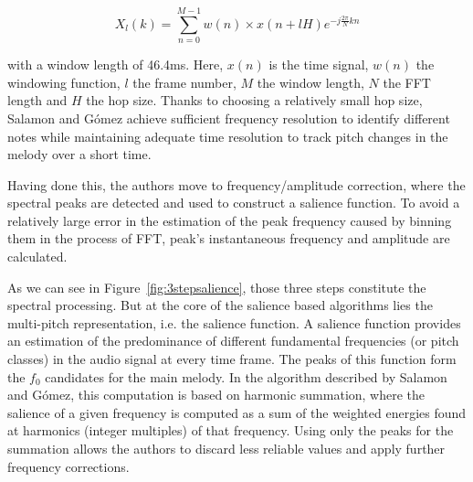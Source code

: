 \begin{equation}
X_{l}(k) = \sum_{n=0}^{M-1} w(n) \times x(n + lH) e^{-j\frac{2 \pi}{N}kn}
\end{equation}

with a window length of 46.4ms. Here, $x(n)$ is the time signal, $w(n)$ the windowing function, $l$ the frame number, $M$ the window length, $N$ the FFT length and $H$ the hop size. Thanks to choosing a relatively small hop size, Salamon and G\'{o}mez achieve sufficient frequency resolution to identify different notes while maintaining adequate time resolution to track pitch changes in the melody over a short time. 

Having done this, the authors move to frequency/amplitude correction, where the spectral peaks are detected and used to construct a salience function. To avoid a relatively large error in the estimation of the peak frequency caused by binning them in the process of FFT, peak’s instantaneous frequency and amplitude are calculated. 

As we can see in Figure~\ref{fig:3stepsalience}, those three steps constitute the spectral processing. But at the core of the salience based algorithms lies the multi-pitch representation, i.e. the salience function. A salience function provides an estimation of the predominance of different fundamental frequencies (or pitch classes) in the audio signal at every time frame. The peaks of this function form the $f_{0}$ candidates for the main melody. In the algorithm described by Salamon and G\'{o}mez, this computation is based on harmonic summation, where the salience of  a given frequency is computed as a sum of the weighted energies found at harmonics (integer multiples) of that frequency. Using only the peaks for the summation allows the authors to discard less reliable values and apply further frequency corrections. 

